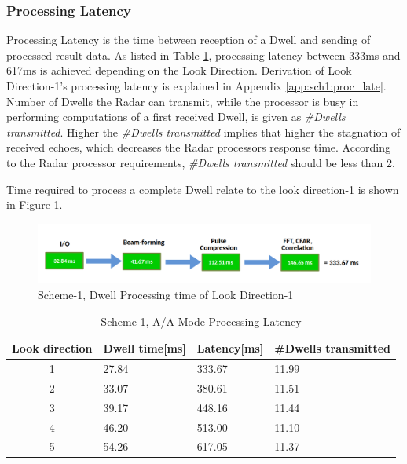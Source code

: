 \subsubsection{Processing Latency}
\label{sss:scheme1:latency}
Processing Latency is the time between reception of a Dwell and sending of processed result data. As listed in Table \ref{tbl:existing_analysis:aa_scheme1_latency}, processing latency between 333ms and 617ms is achieved depending on the Look Direction.  Derivation of Look Direction-1's processing latency is explained in Appendix \ref{app:sch1:proc_late}. Number of Dwells the Radar can transmit, while the processor is busy in performing computations of a first received Dwell, is given as \textsl{\#Dwells transmitted}. Higher the \textsl{\#Dwells transmitted} implies that higher the stagnation of received echoes, which decreases the Radar processors response time. According to the Radar processor requirements, \textsl{\#Dwells transmitted} should be less than 2.

Time required to process a complete Dwell relate to the look direction-1 is shown in Figure \ref{fig:mm:scheme1_latency_tot}.
\begin{figure}[h!]
	\centering
	\includegraphics[width=145mm]{figures/scheme1_latency_tot}
	\caption{Scheme-1, Dwell Processing time of Look Direction-1}
	\label{fig:mm:scheme1_latency_tot}
\end{figure}


\begin{table}[h!]
	\centering
	\begin{tabular}{|c|l|l|l|} 
	 \hline
	 \textbf{Look direction} & \textbf{Dwell time[ms]} & \textbf{Latency[ms]} & \textbf{\#Dwells transmitted} \\
	 \hline
	 1 & 27.84 & 333.67 & 11.99 \\ \hline
	 2 & 33.07 & 380.61 & 11.51 \\ \hline
	 3 & 39.17 & 448.16 & 11.44 \\ \hline
	 4 & 46.20 & 513.00 & 11.10 \\ \hline
	 5 & 54.26 & 617.05 & 11.37 \\ \hline
	\end{tabular}
	\caption{Scheme-1, A/A Mode Processing Latency}
	\label{tbl:existing_analysis:aa_scheme1_latency}
\end{table}

